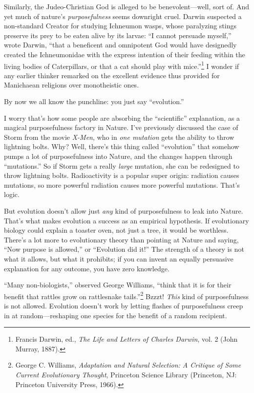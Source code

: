 {
 Similarly, the Judeo-Christian God is alleged to be
benevolent---well, sort of. And yet much of nature's
\textit{purposefulness} seems downright cruel. Darwin suspected a
non-standard Creator for studying Ichneumon wasps, whose paralyzing
stings preserve its prey to be eaten alive by its larvae:
``I cannot persuade myself,'' wrote
Darwin, ``that a beneficent and omnipotent God would
have designedly created the Ichneumonidae with the express intention of
their feeding within the living bodies of Caterpillars, or that a cat
should play with mice.''\footnote{Francis Darwin, ed., \textit{The Life and Letters of Charles
Darwin}, vol. 2 (John Murray, 1887).} I wonder
if any earlier thinker remarked on the excellent evidence thus provided
for Manichaean religions over monotheistic ones.}

{
 By now we all know the punchline: you just say
``evolution.''}

{
 I worry that's how some people are absorbing the
``scientific'' explanation, as a
magical purposefulness factory in Nature. I've
previously discussed the case of Storm from the movie \textit{X-Men},
who in \textit{one mutation} gets the ability to throw lightning bolts.
Why? Well, there's this thing called
``evolution'' that somehow pumps a
lot of purposefulness into Nature, and the changes happen through
``mutations.'' So if Storm gets a
really \textit{large} mutation, she can be redesigned to throw
lightning bolts. Radioactivity is a popular super origin: radiation
causes mutations, so more powerful radiation causes more powerful
mutations. That's logic.}

{
 But evolution doesn't allow just \textit{any} kind
of purposefulness to leak into Nature. That's what
makes evolution a success as an empirical hypothesis. If evolutionary
biology could explain a toaster oven, not just a tree, it would be
worthless. There's a lot more to evolutionary theory
than pointing at Nature and saying, ``Now purpose is
allowed,'' or ``Evolution did
it!'' The strength of a theory is not what it allows,
but what it prohibits; if you can invent an equally persuasive
explanation for any outcome, you have zero knowledge.}

{
 ``Many non-biologists,''
observed George Williams, ``think that it is for their
benefit that rattles grow on rattlesnake
tails.''\footnote{George C. Williams, \textit{Adaptation and Natural Selection: A
Critique of Some Current Evolutionary Thought}, Princeton Science
Library (Princeton, NJ: Princeton University Press, 1966).} Bzzzt! \textit{This} kind
of purposefulness is not allowed. Evolution doesn't
work by letting flashes of purposefulness creep in at
random---reshaping one species for the benefit of a random recipient.}

